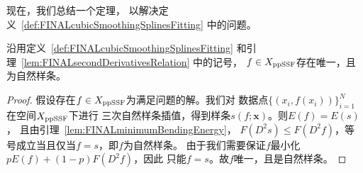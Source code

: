 现在，我们总结一个定理，
以解决定义~\ref{def:FINALcubicSmoothingSplinesFitting}
中的问题。

\begin{thm}
  \label{thm:FINALcubicSmoothingSpline}
  沿用定义~\ref{def:FINALcubicSmoothingSplinesFitting}
  和引理~\ref{lem:FINALsecondDerivativesRelation} 中的记号，
  $f\in X_{\textnormal{ppSSF}}$存在唯一，且为自然样条。
\end{thm}
\begin{proof}
  假设存在$f\in X_{\textnormal{ppSSF}}$为满足问题的解。我们对
  数据点$\{(x_{i},f(x_{i}))\}_{i=1}^{N}$在空间$X_{\textnormal{ppSSF}}$下进行
  三次自然样条插值，得到样条$s(f;\mathbf{x})$。则$E(f)=E(s)$，
  且由引理~\ref{lem:FINALminimumBendingEnergy}，
  $F(D^{2}s)\le F(D^{2}f)$，等号成立当且仅当$f=s$，即$f$为自然样条。
  由于我们需要保证$f$最小化$pE(f)+(1-p)F(D^{2}f)$，因此
  只能$f=s$。故$f$唯一，且是自然样条。


\end{proof}
